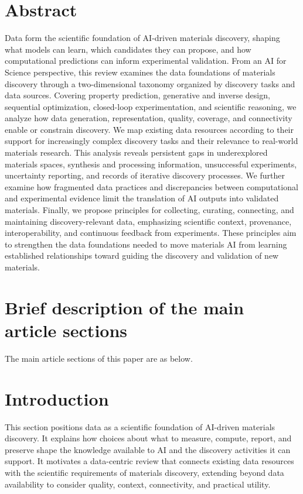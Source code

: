 \documentclass[11pt,a4paper]{article}
\begin{document}
\section*{Abstract}
Data form the scientific foundation of AI-driven materials discovery,
shaping what models can learn, which candidates they can propose, and how
computational predictions can inform experimental validation. From an AI
for Science perspective, this review examines the data foundations of
materials discovery through a two-dimensional taxonomy organized by
discovery tasks and data sources. Covering property prediction, generative
and inverse design, sequential optimization, closed-loop experimentation,
and scientific reasoning, we analyze how data generation, representation,
quality, coverage, and connectivity enable or constrain discovery. We map
existing data resources according to their support for increasingly complex
discovery tasks and their relevance to real-world materials research. This
analysis reveals persistent gaps in underexplored materials spaces,
synthesis and processing information, unsuccessful experiments,
uncertainty reporting, and records of iterative discovery processes. We
further examine how fragmented data practices and discrepancies between
computational and experimental evidence limit the translation of AI outputs
into validated materials. Finally, we propose principles for collecting,
curating, connecting, and maintaining discovery-relevant data, emphasizing
scientific context, provenance, interoperability, and continuous feedback
from experiments. These principles aim to strengthen the data foundations
needed to move materials AI from learning established relationships toward
guiding the discovery and validation of new materials.

\section*{Brief description of the main article sections}
The main article sections of this paper are as below.

\section{Introduction}
This section positions data as a scientific foundation of AI-driven
materials discovery. It explains how choices about what to measure,
compute, report, and preserve shape the knowledge available to AI and the
discovery activities it can support. It motivates a data-centric review
that connects existing data resources with the scientific requirements of
materials discovery, extending beyond data availability to consider
quality, context, connectivity, and practical utility.
\end{document}
